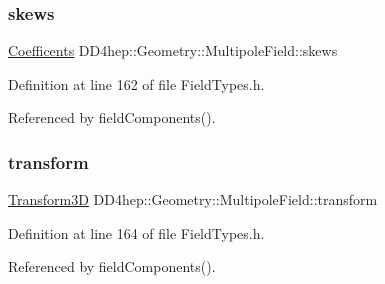 \hypertarget{class_d_d4hep_1_1_geometry_1_1_multipole_field_a52a44a6298e89815f17e1c271b7644d2}{}\label{class_d_d4hep_1_1_geometry_1_1_multipole_field_a52a44a6298e89815f17e1c271b7644d2} 
\subsubsection{\texorpdfstring{skews}{skews}}
{\footnotesize\ttfamily \hyperlink{class_d_d4hep_1_1_geometry_1_1_multipole_field_a760b1b7561c93dd8438ea523cbc660bc}{Coefficents} D\+D4hep\+::\+Geometry\+::\+Multipole\+Field\+::skews}



Definition at line 162 of file Field\+Types.\+h.



Referenced by field\+Components().

\hypertarget{class_d_d4hep_1_1_geometry_1_1_multipole_field_aa4040740a5339e8dc1f1d7e65187ea0e}{}\label{class_d_d4hep_1_1_geometry_1_1_multipole_field_aa4040740a5339e8dc1f1d7e65187ea0e} 
\subsubsection{\texorpdfstring{transform}{transform}}
{\footnotesize\ttfamily \hyperlink{namespace_d_d4hep_1_1_geometry_aeb4c0356d12fd7be49a0aae50514e64b}{Transform3D} D\+D4hep\+::\+Geometry\+::\+Multipole\+Field\+::transform}



Definition at line 164 of file Field\+Types.\+h.



Referenced by field\+Components().

\hypertarget{class_d_d4hep_1_1_geometry_1_1_multipole_field_a6ff1c10d2c4b9a47db39b466e45de63a}{}\label{class_d_d4hep_1_1_geometry_1_1_multipole_field_a6ff1c10d2c4b9a47db39b466e45de63a} 
